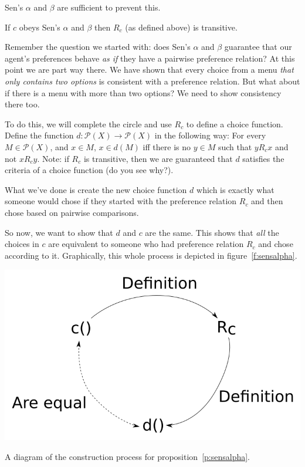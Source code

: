 Sen's $\alpha$ and $\beta$ are sufficient to prevent this.
\begin{proposition}
If $c$ obeys Sen's $\alpha$ and $\beta$ then $R_c$ (as defined above) is transitive.
\end{proposition}

Remember the question we started with: does Sen's $\alpha$ and $\beta$ guarantee that our agent's preferences behave {\it as if} they have a pairwise preference relation?  At this point we are part way there.  We have shown that every choice from a menu {\it that only contains two options} is consistent with a preference relation. But what about if there is a menu with more than two options?  We need to show consistency there too.

To do this, we will complete the circle and use $R_c$ to define a choice function.  Define the function $d: \mathscr{P}(X) \to \mathscr{P}(X)$ in the following way:  For every $M \in \mathscr{P}(X)$, and $x \in M$, $x \in d(M)$ iff there is no $y \in M$ such that $y R_c x$ and not $x R_c y$.  Note: if $R_c$ is transitive, then we are guaranteed that $d$ satisfies the criteria of a choice function (do you see why?). 


What we've done is create the new choice function $d$ which is exactly what someone would chose if they started with the preference relation $R_c$ and then chose based on pairwise comparisons.

So now, we want to show that $d$ and $c$ are the same.  This shows that {\it all} the choices in $c$ are equivalent to someone who had preference relation $R_c$ and chose according to it.  Graphically, this whole process is depicted in figure~\ref{f:sensalpha}.

\begin{marginfigure}
\centering
\includegraphics[width=\textwidth]{ChoiceFunctionDiagram.png}
\caption{A diagram of the construction process for proposition~\ref{p:sensalpha}.}
\label{f:sensalpha}
\end{marginfigure}

